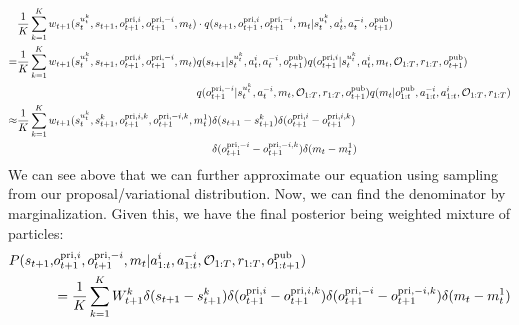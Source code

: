 \begin{equation}
\label{eqn:chap5-sample-index}
\begin{aligned}
    &\frac{1}{K}\sum^K_{k=1} w_{t+1}(s_t^{u^k_t}, s_{t+1}, o^{\operatorname{pri}, i}_{t+1}, o^{\operatorname{pri}, -i}_{t+1}, m_t) \cdot q(s_{t+1}, o^{\operatorname{pri}, i}_{t+1}, o^{\operatorname{pri}, -i}_{t+1}, m_t | s_t^{u^k_t}, a^i_t, a^{-i}_t, o^{\operatorname{pub}}_{t+1}) \\
    =&\begin{aligned}[t]
        \frac{1}{K}\sum^K_{k=1} w_{t+1}(s_t^{u^k_t}, s_{t+1}, o^{\operatorname{pri}, i}_{t+1}, o^{\operatorname{pri}, -i}_{t+1}, m_t) &q(s_{t+1} | s_t^{u^k_t}, a^i_t, a^{-i}_t, o^{\operatorname{pub}}_{t+1}) q(o^{\operatorname{pri}, i}_{t+1} | s_t^{u^k_t}, a^i_t, m_t, \mathcal{O}_{1:T}, r_{1:T}, o^{\operatorname{pub}}_{t+1}) \\
        &q(o^{\operatorname{pri}, -i}_{t+1} | s_t^{u^k_t}, a^{-i}_t, m_t, \mathcal{O}_{1:T}, r_{1:T}, o^{\operatorname{pub}}_{t+1})  q(m_t | o^{\operatorname{pub}}_{1:t}, a^{-i}_{1:t}, a^i_{1:t}, \mathcal{O}_{1:T}, r_{1:T})
    \end{aligned} \\
    \approx&\begin{aligned}[t]
        \frac{1}{K}\sum^K_{k=1} w_{t+1}(s_t^{u^k_t}, s_{t+1}^k, o^{\operatorname{pri}, i, k}_{t+1}, o^{\operatorname{pri}, -i, k}_{t+1}, m_t^1) &\delta (s_{t+1} - s_{t+1}^k) \delta (o^{\operatorname{pri}, i}_{t+1} - o^{\operatorname{pri}, i, k}_{t+1}) \\
        &\delta (o^{\operatorname{pri}, -i}_{t+1} - o^{\operatorname{pri}, -i, k}_{t+1}) \delta (m_t - m_t^1)
    \end{aligned} \\
\end{aligned}
\end{equation}
We can see above that we can further approximate our equation using sampling from our proposal/variational distribution. Now, we can find the denominator by marginalization. Given this, we have the final posterior being weighted mixture of particles:
\begin{equation}
\begin{aligned}
    P(s_{t+1},& o^{\operatorname{pri}, i}_{t+1}, o^{\operatorname{pri}, -i}_{t+1}, m_t | a^{i}_{1:t}, a^{-i}_{1:t}, \mathcal{O}_{1:T}, r_{1:T}, o^{\operatorname{pub}}_{1:t+1}) \\
    &=\frac{1}{K}\sum^K_{k=1} W^k_{t+1} \delta (s_{t+1} - s_{t+1}^k) \delta (o^{\operatorname{pri}, i}_{t+1} - o^{\operatorname{pri}, i, k}_{t+1}) \delta (o^{\operatorname{pri}, -i}_{t+1} - o^{\operatorname{pri}, -i, k}_{t+1}) \delta (m_t - m_t^1)
\end{aligned}
\end{equation}

